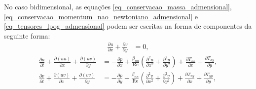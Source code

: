 No caso bidimensional, as equações \eqref{eq_conservacao_massa_admensional}, \eqref{eq_conservacao_momentum_nao_newtoniano_admensional} e \eqref{eq_tensores_lpog_admensional} podem ser escritas na forma de componentes da seguinte forma:
\begin{align}
    \frac{\partial u}{\partial x}+\frac{\partial v}{\partial y}&=0,\label{eq_cont_bidime}
\end{align}
\begin{subequations}
\begin{align}
    \frac{\partial u}{\partial t}+\frac{\partial(u u)}{\partial x}+\frac{\partial(u v)}{\partial y} &= -\frac{\partial p}{\partial x}+\frac{\beta_{nn}}{\operatorname{Re}}\left(\frac{\partial^2 u}{\partial x^2}+\frac{\partial^2 u}{\partial y^2}\right)+\frac{\partial T_{x x}}{\partial x}+\frac{\partial T_{x y}}{\partial y},\label{eq_movi_x_bidime} \\[7mm]
    \frac{\partial v}{\partial t} + \frac{\partial(u v)}{\partial x} + \frac{\partial(v v)}{\partial y} &= -\frac{\partial p}{\partial y}+\frac{\beta_{nn}}{\operatorname{Re}}\left(\frac{\partial^2 v}{\partial x^2}+\frac{\partial^2 v}{\partial y^2}\right)+\frac{\partial T_{x y}}{\partial x}+\frac{\partial T_{yy}}{\partial y},\label{eq_movi_y_bidime}
\end{align}
\end{subequations}
